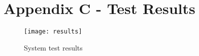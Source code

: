 \newpage
\section{Appendix C - Test Results}
\begin{figure}[h]
	\centering
	\texttt{[image: results]}
	\caption{System test results}
	\label{test_results}
\end{figure}